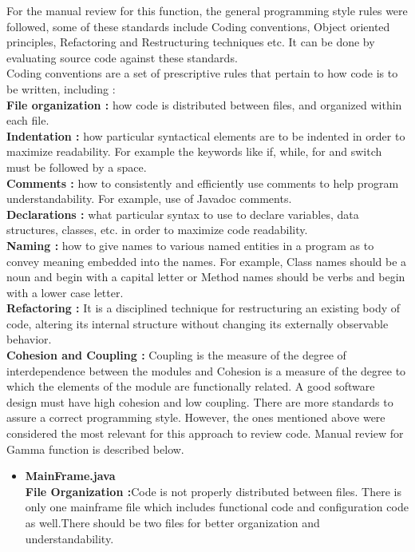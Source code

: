 \documentclass[12pt]{report}
\begin{document}
{For the manual review for this function, the general programming style rules were followed, some of these standards include Coding conventions, Object oriented principles, Refactoring and Restructuring techniques etc. It can be done by evaluating source code against these standards.  \\
\newline
Coding conventions are a set of prescriptive rules that pertain
to how code is to be written, including :\\
\noindent
\textbf{File organization : }how code is distributed between files,
and organized within each file.\\
\textbf{Indentation : }how particular syntactical elements are to
be indented in order to maximize readability. For example the keywords like if, while, for and switch must be followed by a space.\\
\textbf{Comments : }how to consistently and efficiently use
comments to help program understandability. For example, use of Javadoc comments.\\
\textbf{Declarations : }what particular syntax to use to declare
variables, data structures, classes, etc. in order to
maximize code readability.\\
\textbf{Naming : }how to give names to various named entities in
a program as to convey meaning embedded into the
names. For example, Class names should be a noun and begin with a
capital letter or Method names should be verbs and begin with a lower case
letter.\\
\textbf{Refactoring : }It is a disciplined technique for
restructuring an existing body of code, altering its internal
structure without changing its externally observable
behavior. \\
\textbf{Cohesion and Coupling : }Coupling is the measure of the degree of interdependence between the modules and Cohesion is a measure of the degree to which the elements of the module are functionally related. A good software design must have high cohesion and low coupling.
\newline\newline
There are more standards to assure a correct programming style. However, the ones mentioned above were considered the most relevant for this approach to review code. Manual review for Gamma function is described below.
\begin{itemize}
    \item \textbf{MainFrame.java}\\
    \textbf{File Organization :}Code is not properly distributed between files. There is only one mainframe file which includes functional code and configuration code as well.There should be two files for better organization and understandability.\\

\end{itemize}}
\end{document}
